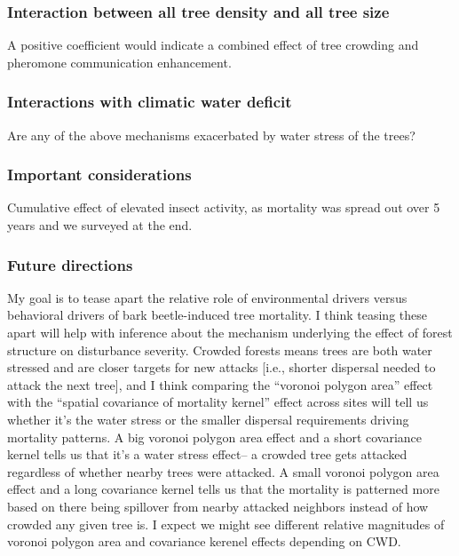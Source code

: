 \documentclass[]{article}
\begin{document}
\subsubsection{Interaction between all tree density and all tree
size}\label{interaction-between-all-tree-density-and-all-tree-size}

A positive coefficient would indicate a combined effect of tree crowding
and pheromone communication enhancement.

\subsubsection{Interactions with climatic water
deficit}\label{interactions-with-climatic-water-deficit}

Are any of the above mechanisms exacerbated by water stress of the
trees?

\subsubsection{Important considerations}\label{important-considerations}

Cumulative effect of elevated insect activity, as mortality was spread
out over 5 years and we surveyed at the end.

\subsubsection{Future directions}\label{future-directions}

My goal is to tease apart the relative role of environmental drivers
versus behavioral drivers of bark beetle-induced tree mortality. I think
teasing these apart will help with inference about the mechanism
underlying the effect of forest structure on disturbance severity.
Crowded forests means trees are both water stressed and are closer
targets for new attacks {[}i.e., shorter dispersal needed to attack the
next tree{]}, and I think comparing the ``voronoi polygon area'' effect
with the ``spatial covariance of mortality kernel'' effect across sites
will tell us whether it's the water stress or the smaller dispersal
requirements driving mortality patterns. A big voronoi polygon area
effect and a short covariance kernel tells us that it's a water stress
effect-- a crowded tree gets attacked regardless of whether nearby trees
were attacked. A small voronoi polygon area effect and a long covariance
kernel tells us that the mortality is patterned more based on there
being spillover from nearby attacked neighbors instead of how crowded
any given tree is. I expect we might see different relative magnitudes
of voronoi polygon area and covariance kerenel effects depending on CWD.
\end{document}
